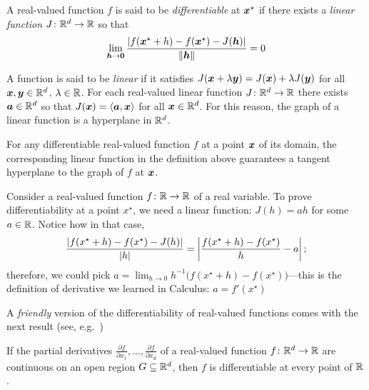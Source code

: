 \begin{definition}\label{def:differentiable}
A real-valued function $f$ is said to be \emph{differentiable} at $\boldsymbol{x}^{\star}$ if there exists a \emph{linear function} $J\colon \mathbb{R}^d \to \mathbb{R}$ so that 
\begin{equation*}
\lim_{\boldsymbol{h} \to \boldsymbol{0}} \frac{\lvert f(\boldsymbol{x}^{\star}+h)-f(\boldsymbol{x}^{\star})-J(\boldsymbol{h}) \rvert}{\lVert \boldsymbol{h} \rVert} = 0
\end{equation*}
\end{definition}

\begin{remark}
A function is said to be \emph{linear} if it satisfies $J(\boldsymbol{x}+\lambda\boldsymbol{y}) = J(\boldsymbol{x}) + \lambda J(\boldsymbol{y})$ for all $\boldsymbol{x}, \boldsymbol{y} \in \mathbb{R}^d$, $\lambda \in \mathbb{R}$.  For each real-valued linear function $J \colon \mathbb{R}^d \to \mathbb{R}$ there exists $\boldsymbol{a} \in \mathbb{R}^d$ so that $J(\boldsymbol{x}) = \langle \boldsymbol{a} , \boldsymbol{x} \rangle$ for all $\boldsymbol{x} \in \mathbb{R}^d$.  For this reason, the graph of a linear function is a hyperplane in $\mathbb{R}^d$.
\end{remark}

\begin{remark}
For any differentiable real-valued function $f$ at a point $\boldsymbol{x}$ of its domain, the corresponding linear function in the definition above guarantees a tangent hyperplane to the graph of $f$ at $\boldsymbol{x}$.  
\end{remark}
 
\begin{example}\label{example:derivatives}
Consider a real-valued function $f\colon \mathbb{R} \to \mathbb{R}$ of a real variable. To prove differentiability at a point $x^\star$, we need a linear function: $J(h)=ah$ for some $a\in \mathbb{R}$. Notice how in that case, 
\begin{equation*}
\frac{\lvert f(x^\star+h)-f(x^\star)-J(h) \rvert}{\lvert h \rvert} = \left\lvert \frac{f(x^\star+h)-f(x^\star)}{h} - a \right\lvert;
\end{equation*}
therefore, we could pick $a = \lim_{h\to 0} h^{-1}\big( f(x^\star+h) - f(x^\star) \big)$---this is the definition of derivative we learned in Calculus: $a=f'(x^\star)$
\end{example}

A \emph{friendly} version of the differentiability of real-valued functions comes with the next result (see, e.g.~\cite[p.818]{finney2001thomas})
\begin{theorem}\label{theorem:partialgivesDerivative}
If the partial derivatives $\frac{\partial f}{\partial x_1}, \dotsc, \frac{\partial f}{\partial x_d}$ of a real-valued function $f \colon \mathbb{R}^d \to \mathbb{R}$ are continuous on an open region $G \subseteq \mathbb{R}^d$, then $f$ is differentiable at every point of $\mathbb{R}$.
\end{theorem}

